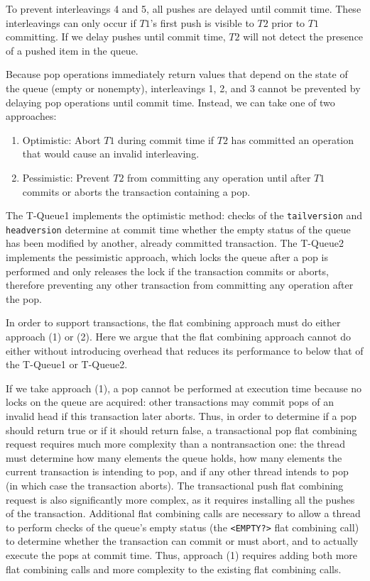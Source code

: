 To prevent interleavings 4 and 5, all pushes are delayed until commit time. These interleavings can only occur if $T1$'s first push is visible to $T2$ prior to $T1$ committing. If we delay pushes until commit time, $T2$ will not detect the presence of a pushed item in the queue.

Because pop operations immediately return values that depend on the state of the queue (empty or nonempty), interleavings 1, 2, and 3 cannot be prevented by delaying pop operations until commit time. Instead, we can take one of two approaches:
\begin{enumerate}
    \item Optimistic: Abort $T1$ during commit time if $T2$ has committed an operation that would cause an invalid interleaving.
    \item Pessimistic: Prevent $T2$ from committing any operation until after $T1$ commits or aborts the transaction containing a pop.
\end{enumerate}

The T-Queue1 implements the optimistic method: checks of the \texttt{tailversion} and \texttt{headversion} determine at commit time whether the empty status of the queue has been modified by another, already committed transaction. The T-Queue2 implements the pessimistic approach, which locks the queue after a pop is performed and only releases the lock if the transaction commits or aborts, therefore preventing any other transaction from committing any operation after the pop.

In order to support transactions, the flat combining approach must do either approach (1) or (2). Here we argue that the flat combining approach cannot do either without introducing overhead that reduces its performance to below that of the T-Queue1 or T-Queue2.

If we take approach (1), a pop cannot be performed at execution time because no locks on the queue are acquired: other transactions may commit pops of an invalid head if this transaction later aborts. Thus, in order to determine if a pop should return true or if it should return false, a transactional pop flat combining request requires much more complexity than a nontransaction one: the thread must determine how many elements the queue holds, how many elements the current transaction is intending to pop, and if any other thread intends to pop (in which case the transaction aborts). The transactional push flat combining request is also significantly more complex, as it requires installing all the pushes of the transaction. Additional flat combining calls are necessary to allow a thread to perform checks of the queue's empty status (the \texttt{<EMPTY?>} flat combining call) to determine whether the transaction can commit or must abort, and to actually execute the pops at commit time. Thus, approach (1) requires adding both more flat combining calls and more complexity to the existing flat combining calls.

